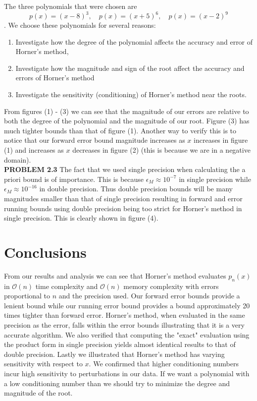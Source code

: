 \documentclass[12pt]{article}
\theoremstyle{remark}
\begin{document}
The three polynomials that were chosen are 
$$ p(x) = (x-8)^3, \quad p(x) = (x+5)^6, \quad p(x) = (x-2)^9 $$.
We choose these polynomials for several reasons:
\begin{enumerate}
	\item Investigate how the degree of the polynomial affects the accuracy and error of Horner's method,
	\item Investigate how the magnitude and sign of the root affect the accuracy and errors of Horner's method
	\item Investigate the sensitivity (conditioning) of Horner's method near the roots.
\end{enumerate}
From figures (1) - (3) we can see that the magnitude of our errors are relative to both the degree of the polynomial and the magnitude of our root. Figure (3) has much tighter bounds than that of figure (1). Another way to verify this is to notice that our forward error bound magnitude increases as $x$ increases in figure (1) and increases as $x$ decreases in figure (2) (this is because we are in a negative domain). \\

\textbf{PROBLEM 2.3} The fact that we used single precision when calculating the a priori bound is of importance. This is because $\epsilon_M \approx 10^{-7}$ in single precision while $\epsilon_M \approx 10^{-16}$ in double precision. Thus double precision bounds will be many magnitudes smaller than that of single precision resulting in forward and error running bounds using double precision being too strict for Horner's method in single precision. This is clearly shown in figure (4).
\section{Conclusions}

From our results and analysis we can see that Horner's method evaluates $p_n(x)$ in $\mathcal{O}(n)$ time complexity and $\mathcal{O}(n)$ memory complexity with errors proportional to $n$ and the precision used. Our forward error bounds provide a lenient bound while our running error bound provides a bound approximately 20 times tighter than forward error. Horner's method, when evaluated in the same precision as the error, falls within the error bounds illustrating that it is a very accurate algorithm. We also verified that computing the "exact" evaluation using the product form in single precision yields almost identical results to that of double precision. Lastly we illustrated that Horner's method has varying sensitivity with respect to $x$. We confirmed that higher conditioning numbers incur high sensitivity to perturbations in our data. If we want a polynomial with a low conditioning number than we should try to minimize the degree and magnitude of the root.
\end{document}
